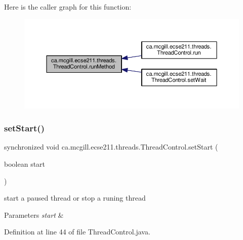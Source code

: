 Here is the caller graph for this function\+:\nopagebreak
\begin{figure}[H]
\begin{center}
\leavevmode
\includegraphics[width=350pt]{classca_1_1mcgill_1_1ecse211_1_1threads_1_1_thread_control_a2959c54bdb6c62c9d5569cdf3ccf2418_icgraph}
\end{center}
\end{figure}
\mbox{\label{classca_1_1mcgill_1_1ecse211_1_1threads_1_1_thread_control_a16221cdc4ccf637b190934549c708e1f}} 
\subsubsection{\texorpdfstring{set\+Start()}{setStart()}}
{\footnotesize\ttfamily synchronized void ca.\+mcgill.\+ecse211.\+threads.\+Thread\+Control.\+set\+Start (\begin{DoxyParamCaption}\item[{boolean}]{start }\end{DoxyParamCaption})}

start a paused thread or stop a runing thread 
\begin{DoxyParams}{Parameters}
{\em start} & \\
\hline
\end{DoxyParams}


Definition at line 44 of file Thread\+Control.\+java.


